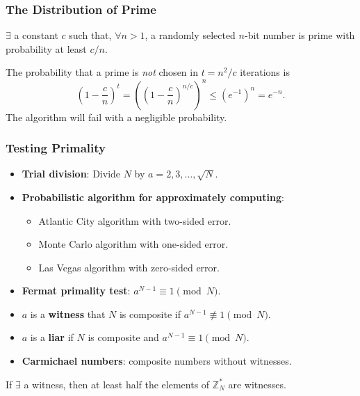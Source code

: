 \begin{frame}\frametitle{The Distribution of Prime}
\begin{theorem}
$\exists$ a constant $c$ such that, $\forall n>1$, a randomly selected $n$-bit number is prime with probability at least $c/n$.
\end{theorem}
The probability that a prime is \emph{not} chosen in $t = n^2/c$ iterations is
\[ \left( 1-\frac{c}{n} \right)^t = \left( \left( 1-\frac{c}{n} \right)^{n/c} \right)^n \le \left( e^{-1} \right)^n = e^{-n}.
\]
The algorithm will fail with a negligible probability.
\end{frame}
\begin{frame}\frametitle{Testing Primality}
\begin{itemize}
\item \textbf{Trial division}: Divide $N$ by $a=2,3,\dotsc,\sqrt{N}.$
\item \textbf{Probabilistic algorithm for approximately computing}:
\begin{itemize}
\item Atlantic City algorithm with two-sided error. 
\item Monte Carlo algorithm with one-sided error.
\item Las Vegas algorithm with zero-sided error.
\end{itemize}
\item \textbf{Fermat primality test}: $a^{N-1} \equiv 1 \pmod N$.
\item $a$ is a \textbf{witness} that $N$ is composite if $a^{N-1} \not \equiv 1 \pmod N$.
\item $a$ is a \textbf{liar} if $N$ is composite and $a^{N-1} \equiv 1 \pmod N$.
\item \textbf{Carmichael numbers}: composite numbers without witnesses.
\end{itemize}
\begin{theorem}
If $\exists$ a witness, then at least half the elements of $\mathbb{Z}_N^*$ are witnesses.
\end{theorem}
\end{frame}

